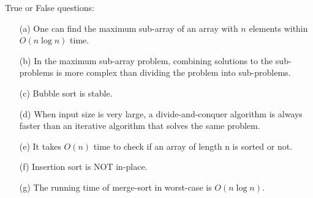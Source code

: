 \noindent {} True or False questions: 
\begin{enumerate}
    \item[(a)] One can find the maximum sub-array of an array with $n$ elements within $O(n \log n)$ time. 
    \text{~} \hfill {} 
    \item[(b)] In the maximum sub-array problem, combining solutions to the sub-problems is more complex than dividing the problem into sub-problems. 
    \hfill {}
    \item[(c)] Bubble sort is stable. 
    \hfill {} 
    \item[(d)] When input size is very large, a divide-and-conquer algorithm is always faster than an iterative algorithm that solves the same problem. 
    \hfill {}
    \item[(e)] It takes $O(n)$ time to check if an array of length n is sorted or not. 
    \hfill {} 
    \item[(f)] Insertion sort is NOT in-place. 
    \hfill {}
    \item[(g)] The running time of merge-sort in worst-case is $O(n \log n)$. 
    \hfill {} \\
\end{enumerate}
